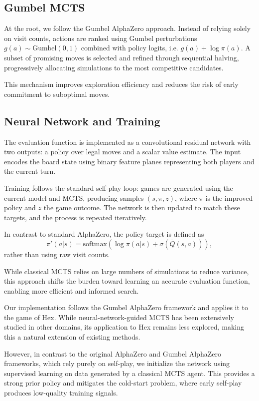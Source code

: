 \documentclass[11pt,a4paper]{article}
\begin{document}
\subsection{Gumbel MCTS}

At the root, we follow the Gumbel AlphaZero approach. Instead of relying solely on visit counts, actions are ranked using Gumbel perturbations $g(a) \sim \text{Gumbel}(0,1)$ combined with policy logits, i.e. $g(a) + \log \pi(a)$. A subset of promising moves is selected and refined through sequential halving, progressively allocating simulations to the most competitive candidates.

This mechanism improves exploration efficiency and reduces the risk of early commitment to suboptimal moves.

\subsection{Neural Network and Training}

The evaluation function is implemented as a convolutional residual network with two outputs: a policy over legal moves and a scalar value estimate. The input encodes the board state using binary feature planes representing both players and the current turn.

Training follows the standard self-play loop: games are generated using the current model and MCTS, producing samples $(s, \pi, z)$, where $\pi$ is the improved policy and $z$ the game outcome. The network is then updated to match these targets, and the process is repeated iteratively.

In contrast to standard AlphaZero, the policy target is defined as
\[
\pi'(a|s) = \mathrm{softmax}(\log \pi(a|s) + \sigma(\bar{Q}(s,a))),
\]
rather than using raw visit counts.

\medskip

While classical MCTS relies on large numbers of simulations to reduce variance, this approach shifts the burden toward learning an accurate evaluation function, enabling more efficient and informed search.

\medskip

Our implementation follows the Gumbel AlphaZero framework and applies it to the game of Hex. While neural-network-guided MCTS has been extensively studied in other domains, its application to Hex remains less explored, making this a natural extension of existing methods.

However, in contrast to the original AlphaZero and Gumbel AlphaZero frameworks, which rely purely on self-play, we initialize the network using supervised learning on data generated by a classical MCTS agent. This provides a strong prior policy and mitigates the cold-start problem, where early self-play produces low-quality training signals.
\end{document}
